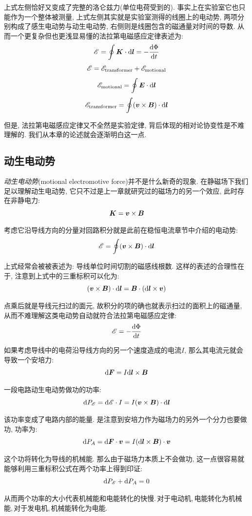 上式左侧恰好又变成了完整的洛仑兹力(单位电荷受到的). 事实上在实验室它也只能作为一个整体被测量, 上式左侧其实就是实验室测得的线圈上的电动势, 两项分别构成了感生电动势与动生电动势, 右侧则是线圈包含的磁通量对时间的导数. 从而一个更复杂但也更浅显易懂的法拉第电磁感应定律表述为:
\[\mathscr{E}=\oint\boldsymbol{K}\cdot \textrm{d} \boldsymbol{l}=-\frac{\textrm{d}\Phi}{\textrm{d} t}\]
\[\mathscr{E}=\mathscr{E}_{\rm transformer}+\mathscr{E}_{\rm motional}\]
\[\mathscr{E}_{\rm motional}=\oint\boldsymbol{E}\cdot\textrm{d}\boldsymbol{l}\]
\[\mathscr{E}_{\rm transformer}=\oint(\boldsymbol{v}\times\boldsymbol{B})\cdot\textrm{d}\boldsymbol{l}\]

但是, 法拉第电磁感应定律又不全然是实验定律, 背后体现的相对论协变性是不难理解的. 我们从本章的论述就会逐渐明白这一点.


\subsection{动生电动势}

\emph{动生电动势}(motional electromotive force)并不是什么新奇的现象. 在静磁场下我们足以理解动生电动势, 它只不过是上一章就研究过的磁场力的另一个效应, 此时存在非静电力:
\[\boldsymbol{K}=\boldsymbol{v}\times \boldsymbol{B}\]

考虑它沿导线方向的分量对回路积分就是此前在稳恒电流章节中介绍的电动势:
\[\mathscr{E}=\oint(\boldsymbol{v}\times\boldsymbol{B})\cdot\textrm{d}\boldsymbol{l}\]

上式经常会被被表述为: 导线单位时间切割的磁感线根数. 这样的表述的合理性在于, 注意到上式中的三重标积可以化为:
\[(\boldsymbol{v}\times\boldsymbol{B})\cdot\textrm{d}\boldsymbol{l}=\boldsymbol{B}\cdot(\textrm{d}\boldsymbol{l}\times\boldsymbol{v}) \]

点乘后就是导线元扫过的面元, 故积分的项的确也就表示扫过的面积上的磁通量, 从而不难理解这类电动势自动就符合法拉第电磁感应定律:
\[\mathscr{E}=-\frac{\textrm{d}\Phi}{\textrm{d} t}\]

如果考虑导线中的电荷沿导线方向的另一个速度造成的电流$I$, 那么其电流元就会导致一个安培力:
\[\textrm{d}\boldsymbol{F}=I\textrm{d}\boldsymbol{l}\times \boldsymbol{B}\]

一段电路动生电动势做功的功率:
\[\textrm{d} P_{\mathscr{E}}=\textrm{d} \mathscr{E}\cdot I=I(\boldsymbol{v}\times \boldsymbol{B})\cdot \textrm{d}\boldsymbol{l}\]

该功率变成了电路内部的能量. 是注意到安培力作为磁场力的另外一个分力也要做功, 功率为:
\[\textrm{d} P_A=\textrm{d} \boldsymbol{F}\cdot \boldsymbol{v}=I(\textrm{d}\boldsymbol{l}\times \boldsymbol{B})\cdot  \boldsymbol{v}\]

这个功将转化为导线的机械能. 那么由于磁场力本质上不会做功, 这一点很容易就能够利用三重标积公式在两个功率上得到印证:
\[\textrm{d} P_{\mathscr{E}}+\textrm{d} P_A=0\]

从而两个功率的大小代表机械能和电能转化的快慢.\,对于电动机,\,电能转化为机械能,\,对于发电机,\,机械能转化为电能.

